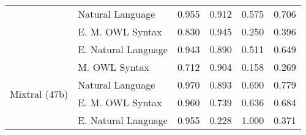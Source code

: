 \begin{table}[ht]
{\begin{tabular}{|l|l|l|l|l|l|}
 & Natural Language                               & 0.955 & 0.912 & 0.575 & 0.706 \\ \cline{2-6}
 & \cellcolor[HTML]{EFEFEF} E. M. OWL Syntax      & \cellcolor[HTML]{EFEFEF} 0.830 & \cellcolor[HTML]{EFEFEF} 0.945 & \cellcolor[HTML]{EFEFEF} 0.250 & \cellcolor[HTML]{EFEFEF} 0.396 \\ \cline{2-6}
 & E. Natural Language                            & 0.943 & 0.890 & 0.511 & 0.649 \\ \cline{1-6}
\hline
\multirow{4}{*}{Mixtral (47b)} 
 & \cellcolor[HTML]{EFEFEF} M. OWL Syntax         & \cellcolor[HTML]{EFEFEF} 0.712 & \cellcolor[HTML]{EFEFEF} 0.904 & \cellcolor[HTML]{EFEFEF} 0.158 & \cellcolor[HTML]{EFEFEF} 0.269 \\ \cline{2-6}
 & Natural Language                               & 0.970 & 0.893 & 0.690 & 0.779 \\ \cline{2-6}
 & \cellcolor[HTML]{EFEFEF} E. M. OWL Syntax      & \cellcolor[HTML]{EFEFEF} 0.960 & \cellcolor[HTML]{EFEFEF} 0.739 & \cellcolor[HTML]{EFEFEF} 0.636 & \cellcolor[HTML]{EFEFEF} 0.684 \\ \cline{2-6}
 & E. Natural Language                            & 0.955 & 0.228 & 1.000 & 0.371 \\ \cline{1-6}
\hline
\end{tabular}
}
\end{table}


